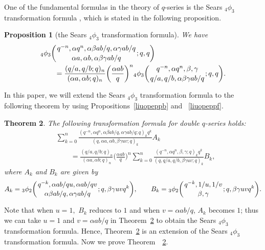 \documentclass[pdftex]{sigma}
\numberwithin{equation}{section}
\newtheorem{Theorem}{Theorem}[section]
\newtheorem{Proposition}[Theorem]{Proposition}
 { \theoremstyle{definition}
\newtheorem{Definition}[Theorem]{Definition}
\newtheorem{Note}[Theorem]{Note}
\newtheorem{Example}[Theorem]{Example}
\newtheorem{Remark}[Theorem]{Remark} }
\begin{document}
One of the fundamental formulas in the theory of $q$-series is the Sears $_4\phi_3$ transformation formula \cite[p.~49, equation~(2.10.4)]{Gas+Rah},
which is stated in the following proposition.
\begin{Proposition}[the Sears $_4\phi_3$ transformation formula]\label{Searstrs}
	We have
	\begin{align*}
		&{_4 \phi_3} \biggl({{q^{-n}, \alpha q^n, \alpha \beta ab/q, \alpha \gamma ab/q}
			\atop{\alpha a, \alpha b,\alpha \beta \gamma ab/q}}; q, q\biggr)\\
		&\qquad{}=\frac{(q/a, q/b; q)_n}{(\alpha a, \alpha b; q)_n}
		\biggl(\frac{\alpha ab}{q}\biggr)^n
		{_4 \phi_3} \biggl({{q^{-n}, \alpha q^n, \beta, \gamma}
			\atop{q/a, q/b,\alpha \beta \gamma ab/q}}; q, q\biggr).
	\end{align*}
\end{Proposition}
In this paper, we will extend the Sears $_4\phi_3$ transformation formula to the following theorem by using Propositions~\ref{liuopeppb} and ~\ref{liuopeppf}.
\begin{Theorem}\label{ExtSearstrs} The following transformation formula
	for double $q$-series holds:
	\begin{align*}
		&\sum_{k=0}^{n} \frac{(q^{-n}, \alpha q^n, \alpha \beta ab/q, \alpha \gamma ab/q ; q)_k q^k}
		{(q, \alpha a, \alpha b, \beta \gamma uv; q)_k} A_k\\
		&\qquad{}=\frac{(q/a, q/b; q)_n}{(\alpha a, \alpha b; q)_n}
		\biggl(\frac{\alpha ab}{q}\biggr)^n
		\sum_{k=0}^{n} \frac{(q^{-n}, \alpha q^n, \beta, \gamma; q)_k q^k}{(q, q/a, q/b, \beta \gamma uv; q)_k}B_k,
	\end{align*}
	where $A_k$ and $B_k$ are given by
	\begin{equation*}
		A_k= {_3\phi_2} \biggl({{q^{-k}, \alpha ab/qu, \alpha ab/qv}
			\atop{\alpha \beta ab/q, \alpha \gamma ab/q }}; q, \beta \gamma uv q^k \biggr),\qquad
		B_k={_3\phi_2 \biggl({{q^{-k}, 1/u, 1/v}\atop{\beta, \gamma}}; q, \beta \gamma uv q^k\biggr)}.
	\end{equation*}
\end{Theorem}
Note that when $u=1,$ $B_k$ reduces to $1$ and when $v=\alpha ab/q$, $A_k$ becomes $1$; thus we
can take $u=1$ and $v=\alpha ab/q$ in Theorem~\ref{ExtSearstrs} to obtain the Sears $_4\phi_3$ transformation formula. Hence, Theorem~\ref{ExtSearstrs} is an extension of the Sears $_4\phi_3$ transformation formula.
Now we prove Theorem~~\ref{ExtSearstrs}.
\end{document}
